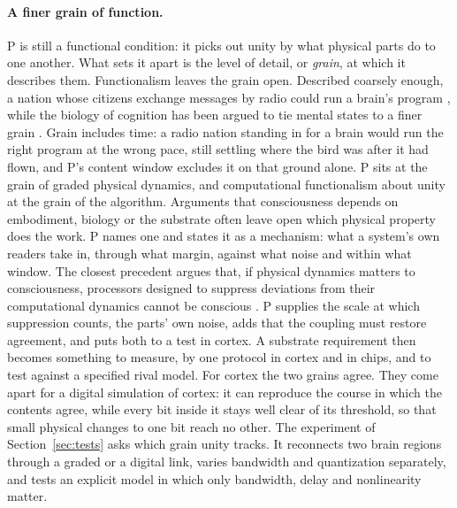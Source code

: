 \documentclass[12pt]{article}
\begin{document}
\paragraph{A finer grain of function.} P is still a functional condition: it
picks out unity by what physical parts do to one another. What sets it apart is
the level of detail, or \emph{grain}, at which it describes them. Functionalism
leaves the grain open. Described coarsely enough, a nation whose citizens
exchange messages by radio could run a brain's program \citep{block1978}, while
the biology of cognition has been argued to tie mental states to a finer grain
\citep{godfreysmith2016}. Grain includes time: a radio nation standing in for a
brain would run the right program at the wrong pace, still settling where the
bird was after it had flown, and P's content window excludes it on that ground
alone. P sits at the grain of graded physical dynamics, and
computational functionalism about unity at the grain of the algorithm.
Arguments that consciousness depends on embodiment, biology or the substrate
often leave open which physical property does the work. P names one and states
it as a mechanism: what a system's own readers take in, through what margin,
against what noise and within what window. The closest precedent argues that, if
physical dynamics matters to consciousness, processors designed to suppress
deviations from their computational dynamics cannot be conscious
\citep{kleiner2024}. P supplies the scale at which suppression counts, the
parts' own noise, adds that the coupling must restore agreement, and puts both
to a test in cortex. A substrate requirement then becomes
something to measure, by one protocol in cortex and in chips, and to test
against a specified rival model. For cortex the two grains agree. They come apart for a digital simulation of
cortex: it can reproduce the course in which the contents agree, while every
bit inside it stays well clear of its threshold, so that small physical changes
to one bit reach no other. The experiment of Section~\ref{sec:tests} asks which
grain unity tracks. It reconnects two brain regions through a graded or a
digital link, varies bandwidth and quantization separately, and tests an
explicit model in which only bandwidth, delay and nonlinearity matter.
\end{document}
